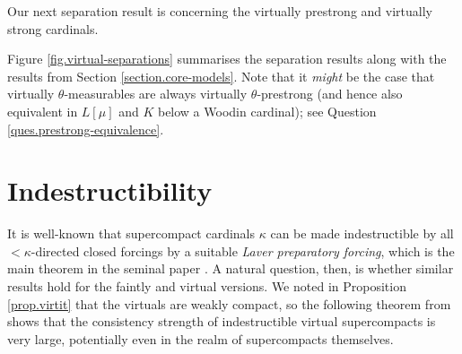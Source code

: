 \documentclass[../../main]{subfiles}
\begin{document}
\qquad Our next separation result is concerning the virtually prestrong and virtually strong cardinals.



\qquad Figure \ref{fig.virtual-separations} summarises the separation results along with the results from Section \ref{section.core-models}. Note that it \textit{might} be the case that virtually $\theta$-measurables are always virtually $\theta$-prestrong (and hence also equivalent in $L[\mu]$ and $K$ below a Woodin cardinal); see Question \ref{ques.prestrong-equivalence}.




\section{Indestructibility}

It is well-known that supercompact cardinals $\kappa$ can be made indestructible by all ${<}\kappa$-directed closed forcings by a suitable \textit{Laver preparatory forcing}, which is the main theorem in the seminal paper \cite{laver-indestructibility}. A natural question, then, is whether similar results hold for the faintly and virtual versions. We noted in Proposition \ref{prop.virtit} that the virtuals are weakly compact, so the following theorem from \cite{mousestack} shows that the consistency strength of indestructible virtual supercompacts is very large, potentially even in the realm of supercompacts themselves.
\end{document}
